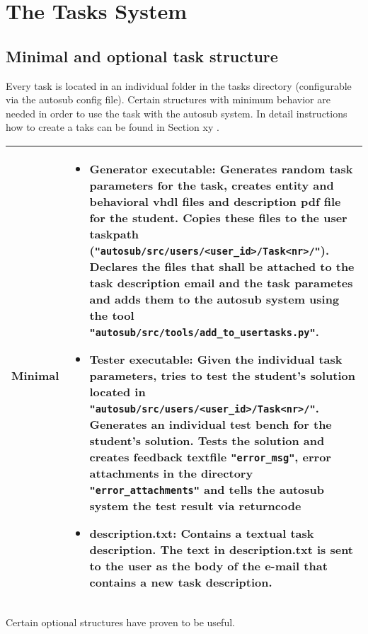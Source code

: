 \section{The Tasks System} \label{tasks_system}

\subsection{Minimal and optional task structure}

Every task is located in an individual folder in the tasks directory (configurable via 
the autosub config file). Certain structures with minimum behavior are needed in order 
to use the task with the autosub system. In detail instructions how to create a taks can 
be found in Section xy .

\begin{tabular}{|p{3cm}|p{10cm}|}
\hline

Minimal & \begin{itemize}
    \item {\bf Generator executable:} Generates random task parameters for the task, 
		creates entity and behavioral vhdl files and description pdf file for the student. Copies
		these files to the user taskpath ({\tt "autosub/src/users/<user\_id>/Task<nr>/"}). Declares
		the files that shall be attached to the task description email and the task parametes and 
		adds them to the autosub system using the tool {\tt "autosub/src/tools/add\_to\_usertasks.py"}.
    \item {\bf Tester executable:} Given the individual task parameters, tries to test
		the student's solution located in {\tt "autosub/src/users/<user\_id>/Task<nr>/"}. 
		Generates an individual test bench for the student's solution. Tests 
        the solution and creates feedback textfile {\tt "error\_msg"}, error attachments in the directory
		{\tt "error\_attachments"} and tells the autosub system the test result via returncode
    \item {\bf description.txt:} Contains a textual task description. The text in description.txt 
    	is sent to the user as the body of the e-mail that contains a new task description.
	\end{itemize} 
\\
\hline
\end{tabular}

\newpage

Certain optional structures have proven to be useful.

